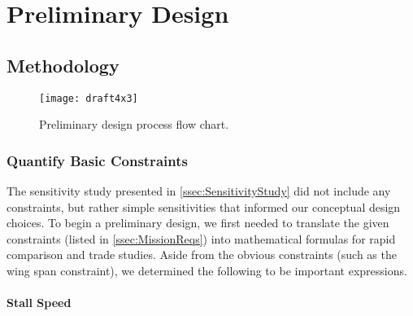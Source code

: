 \section{Preliminary Design} %
\label{sec:PreliminaryDesign}


\subsection{Methodology}
\label{ssec:methodology}


\begin{figure}[h!]
	\centering
	\texttt{[image: draft4x3]}
	\caption{Preliminary design process flow chart.}
	\label{fig:prelimdesflow}
\end{figure}



\subsubsection{Quantify Basic Constraints}
\label{sssec:constraints}

The sensitivity study presented in \cref{ssec:SensitivityStudy} did not include any constraints, but rather simple sensitivities that informed our conceptual design choices.  To begin a preliminary design, we first needed to translate the given constraints (listed in \cref{ssec:MissionReqs}) into mathematical formulas for rapid comparison and trade studies. Aside from the obvious constraints (such as the wing span constraint), we determined the following to be important expressions.

\paragraph{Stall Speed}

